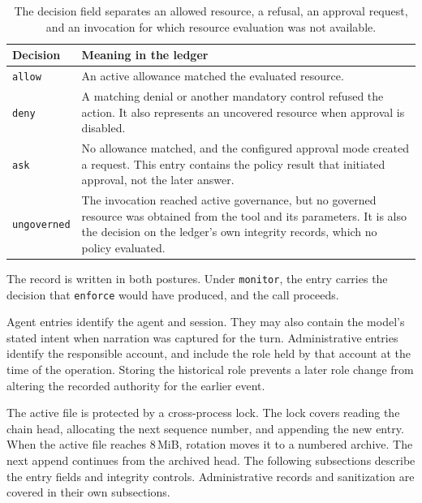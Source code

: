 \begin{table}[htbp]
\centering
\small
\renewcommand{\arraystretch}{1.25}
\begin{tabular}{@{}
  >{\raggedright\arraybackslash}p{2.5cm}
  >{\raggedright\arraybackslash}p{10.4cm}
@{}}
\toprule
\textbf{Decision} & \textbf{Meaning in the ledger} \\
\midrule
\texttt{allow} &
An active allowance matched the evaluated resource. \\

\texttt{deny} &
A matching denial or another mandatory control refused the action. It also
represents an uncovered resource when approval is disabled. \\

\texttt{ask} &
No allowance matched, and the configured approval mode created a request. This
entry contains the policy result that initiated approval, not the later answer. \\

\texttt{ungoverned} &
The invocation reached active governance, but no governed resource was obtained
from the tool and its parameters. {\color{red}It is also the decision on the
ledger's own integrity records, which no policy evaluated.} \\
\bottomrule
\end{tabular}
\caption[Audit-ledger decision values]
{\footnotesize The decision field separates an allowed resource, a refusal, an
approval request, and an invocation for which resource evaluation was not
available.}
\label{tab:gov-ledger-decisions}
\end{table}

{\color{red}The record is written in both postures. Under \texttt{monitor}, the
entry carries the decision that \texttt{enforce} would have produced, and the
call proceeds.}

Agent entries identify the agent and session. They may also contain the model's
stated intent when narration was captured for the turn. Administrative entries
identify the responsible account, and include the role held by that account
at the time of the operation. Storing the historical role prevents a later role
change from altering the recorded authority for the earlier event.

The active file is protected by a cross-process lock. The lock covers reading
the chain head, allocating the next sequence number, and appending the new
entry. When the active file reaches 8\,MiB, rotation moves it to a numbered
archive. The next append continues from the archived head. The following
subsections describe the entry fields and integrity controls. Administrative
records and sanitization are covered in their own subsections.

